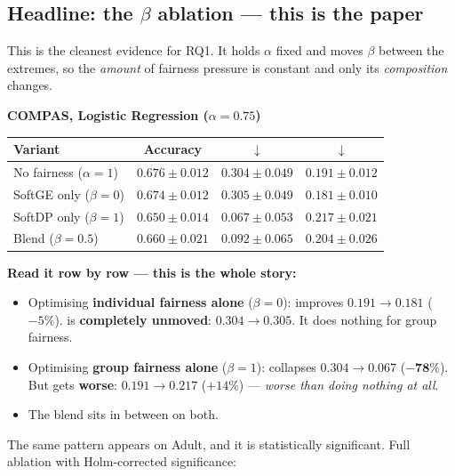 \subsection{Headline: the \texorpdfstring{$\beta$}{beta} ablation --- this is the paper}

This is the cleanest evidence for RQ1. It holds $\alpha$ fixed and moves $\beta$
between the extremes, so the \emph{amount} of fairness pressure is constant and
only its \emph{composition} changes.

\begin{center}
\small
\textbf{COMPAS, Logistic Regression ($\alpha = 0.75$)}\\[3pt]
\begin{tabular}{@{}lccc@{}}
\toprule
\textbf{Variant} & \textbf{Accuracy} & \textbf{\dpdtwo{}} $\downarrow$ & \textbf{\getwo{}} $\downarrow$ \\
\midrule
No fairness ($\alpha{=}1$) & $0.676 \pm 0.012$ & $0.304 \pm 0.049$ & $0.191 \pm 0.012$ \\
\rowcolor{goodlt} SoftGE only ($\beta{=}0$) & $0.674 \pm 0.012$ & $\mathbf{0.305} \pm 0.049$ & $\mathbf{0.181} \pm 0.010$ \\
\rowcolor{warnlt} SoftDP only ($\beta{=}1$) & $0.650 \pm 0.014$ & $\mathbf{0.067} \pm 0.053$ & $\mathbf{0.217} \pm 0.021$ \\
Blend ($\beta{=}0.5$) & $0.660 \pm 0.021$ & $0.092 \pm 0.065$ & $0.204 \pm 0.026$ \\
\bottomrule
\end{tabular}
\end{center}

\textbf{Read it row by row --- this is the whole story:}
\begin{itemize}
\item Optimising \textbf{individual fairness alone} ($\beta=0$): \getwo{}
improves $0.191 \to 0.181$ ($-5\%$). \dpdtwo{} is \textbf{completely unmoved}:
$0.304 \to 0.305$. It does nothing for group fairness.
\item Optimising \textbf{group fairness alone} ($\beta=1$): \dpdtwo{} collapses
$0.304 \to 0.067$ ($\mathbf{-78\%}$). But \getwo{} gets \textbf{worse}:
$0.191 \to 0.217$ ($+14\%$) --- \emph{worse than doing nothing at all}.
\item The blend sits in between on both.
\end{itemize}

The same pattern appears on Adult, and it is statistically significant. Full
ablation with Holm-corrected significance:

